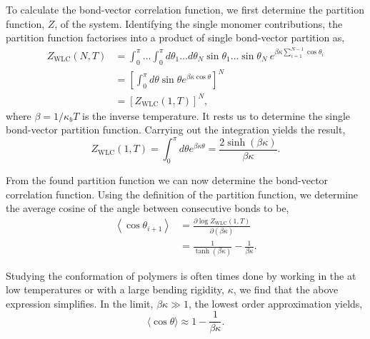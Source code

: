 To calculate the bond-vector correlation function,  we first determine the partition
function, $Z$, of the system. Identifying the single monomer contributions, the partition
function factorises into a product of single bond-vector partition as,
\begin{equation}
    \begin{aligned}
        \label{210}
        Z_{\mathrm{WLC}}(N, T)
        &= \int_{0}^{\pi}\dots \int_{0}^{\pi} d \theta_1 \dots d \theta_N \sin \theta_1 \dots
        \sin \theta_N\ e^{\beta \kappa \sum_{i=1}^{N-1} \cos\theta_i}\\
        &= \left[\int_{0}^{\pi} d \theta \sin \theta e^{\beta \kappa \cos
        \theta}\right]^{N}\\
        &= \left[Z_{\mathrm{WLC}}(1, T)\right]^{N},
    \end{aligned}
\end{equation}
where $\beta=1/\kappa_b T$ is the inverse temperature. It rests us to determine the
single bond-vector partition function. Carrying out the integration yields the result,
\begin{equation}
    Z_{\mathrm{WLC}}(1, T)=\int_{0}^{\pi} d \theta e^{\beta \kappa \theta}=\frac{2
    \sinh(\beta \kappa)}{\beta \kappa}.
\end{equation}


From the found partition function we can now determine the bond-vector correlation
function. Using the definition of the partition function, we determine the average cosine
of the angle between consecutive bonds to be,
\begin{equation}
    \begin{aligned}
    \left\langle\cos \theta_{i+1}\right\rangle
    &=\frac{\partial \log Z_{\mathrm{WLC}}(1, T)}{\partial(\beta \kappa)}\\
    &= \frac{1}{\tanh(\beta \kappa)} - \frac{1}{\beta \kappa}.
    \end{aligned}
\end{equation}

Studying the conformation of polymers is often times done by working in the  at low
temperatures or with a large bending rigidity, $\kappa$, we find
that the above expression simplifies. In the limit, $\beta \kappa \gg 1$, the lowest
order approximation yields,
\begin{equation}
    \langle\cos \theta\rangle \approx 1-\frac{1}{\beta \kappa}.
\end{equation}

